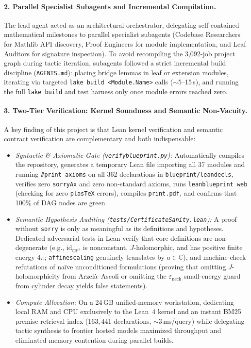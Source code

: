 \documentclass[10pt]{article}
\renewcommand{\_}{\origus\allowbreak}
\newcommand{\CP}{\mathbb{CP}^1}
\newcommand{\C}{\mathbb{C}}
\newcommand{\eps}{\varepsilon}
\newcommand{\code}[1]{\texttt{#1}}
\begin{document}
\paragraph{2. Parallel Specialist Subagents and Incremental Compilation.}
The lead agent acted as an architectural orchestrator, delegating self-contained mathematical
milestones to parallel specialist subagents (Codebase Researchers for Mathlib API discovery, Proof
Engineers for module implementation, and Leaf Auditors for signature inspection). To avoid
recompiling the 3,092-job project graph during tactic iteration, subagents followed a strict
incremental build discipline (\code{AGENTS.md}): placing bridge lemmas in leaf or extension modules,
iterating via targeted \code{lake build <Module.Name>} calls ($\sim$5--15\,s), and running the full
\code{lake build} and test harness only once module errors reached zero.

\paragraph{3. Two-Tier Verification: Kernel Soundness and Semantic Non-Vacuity.}
A key finding of this project is that Lean kernel verification and semantic contract verification are
complementary and both indispensable:
\begin{itemize}
\item \emph{Syntactic \& Axiomatic Gate (\code{verify\_blueprint.py}):} Automatically compiles the
  repository, generates a temporary Lean file importing all 37 modules and running
  \code{\#print axioms} on all 362 declarations in \code{blueprint/lean\_decls}, verifies zero
  \code{sorryAx} and zero non-standard axioms, runs \code{leanblueprint web} (checking for zero
  \code{plasTeX} errors), compiles \code{print.pdf}, and confirms that 100\% of DAG nodes are green.
\item \emph{Semantic Hypothesis Auditing (\code{tests/CertificateSanity.lean}):} A proof without
  \code{sorry} is only as meaningful as its definitions and hypotheses. Dedicated adversarial tests
  in Lean verify that core definitions are non-degenerate (e.g., $\mathrm{id}_{\CP}$ is nonconstant,
  $J$-holomorphic, and has positive finite energy $4\pi$; \code{affine\_scaling} genuinely translates
  by $a\in\C$), and machine-check refutations of naïve unconditioned formulations (proving that
  omitting $J$-holomorphicity from Arzel\`a--Ascoli or omitting the $\eps_{\mathrm{neck}}$ small-energy
  guard from cylinder decay yields false statements).
\item \emph{Compute Allocation:} On a 24\,GB unified-memory workstation, dedicating local RAM and CPU
  exclusively to the Lean~4 kernel and an instant BM25 premise-retrieval index ($163{,}441$
  declarations, $\sim$3\,ms/query) while delegating tactic synthesis to frontier hosted models
  maximized throughput and eliminated memory contention during parallel builds.
\end{itemize}
\end{document}

